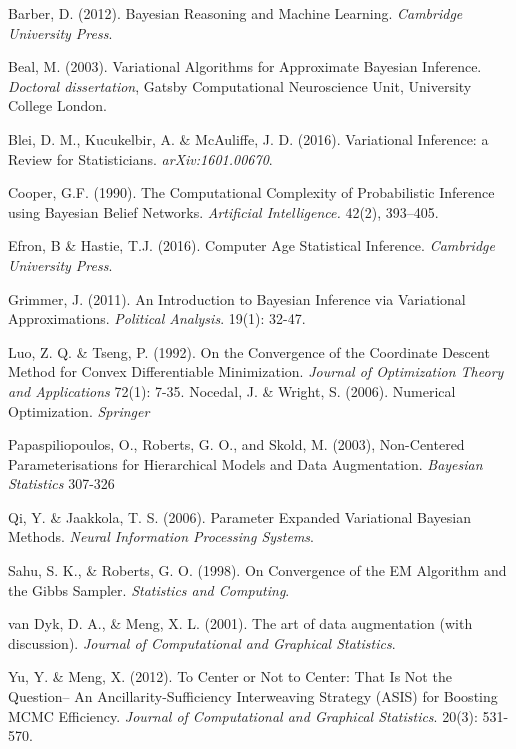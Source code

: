 \documentclass{article}
\begin{document}
\begin{thebibliography}{10}

 Barber, D. (2012). Bayesian Reasoning and Machine Learning. {\sl Cambridge University Press}.

 Beal, M. (2003). Variational Algorithms for Approximate Bayesian Inference. {\sl Doctoral dissertation}, Gatsby Computational Neuroscience Unit, University College London.

 Blei, D. M., Kucukelbir, A. \& McAuliffe, J. D. (2016). Variational Inference: a Review for Statisticians. {\itshape arXiv:1601.00670}.

 Cooper, G.F. (1990). The Computational Complexity of Probabilistic Inference using Bayesian Belief Networks. {\sl Artificial Intelligence.} 42(2), 393–405.

 Efron, B \& Hastie, T.J. (2016). Computer Age Statistical Inference. {\itshape Cambridge University Press}.

 Grimmer, J. (2011). An Introduction to Bayesian Inference via Variational Approximations. {\itshape Political Analysis}. 19(1): 32-47.

 Luo, Z. Q. \& Tseng, P. (1992). On the Convergence of the Coordinate Descent Method for Convex Differentiable Minimization. {\itshape Journal of Optimization Theory and Applications} 72(1): 7-35. 
 Nocedal, J. \& Wright, S. (2006). Numerical Optimization. {\itshape Springer}

 Papaspiliopoulos, O., Roberts, G. O., and Skold, M. (2003), Non-Centered Parameterisations for Hierarchical Models and Data Augmentation. {\sl Bayesian Statistics} 307-326

 Qi, Y. \& Jaakkola, T. S. (2006). Parameter Expanded Variational Bayesian Methods. {\itshape Neural Information Processing Systems}. 

 Sahu, S. K., \& Roberts, G. O. (1998). On Convergence of the EM Algorithm and the Gibbs Sampler. {\sl Statistics
and Computing}. 

 van Dyk, D. A., \& Meng, X. L. (2001). The art of data augmentation (with discussion). {\sl Journal of Computational and Graphical Statistics}.

 Yu, Y. \& Meng, X. (2012). To Center or Not to Center: That Is Not the
Question-- An Ancillarity-Sufficiency Interweaving Strategy (ASIS) for Boosting MCMC Efficiency. {\itshape Journal of Computational and Graphical Statistics}. 20(3): 531-570. 
\end{thebibliography}
\end{document}
